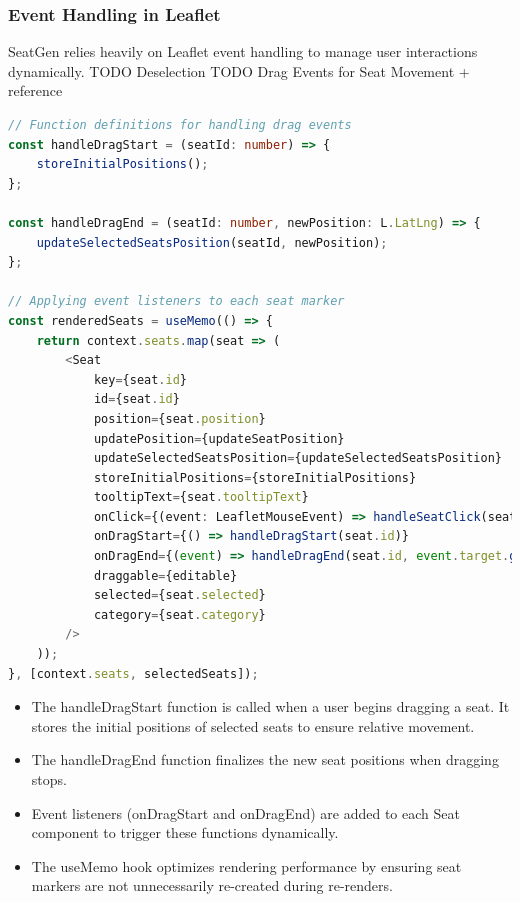 \subsubsection{Event Handling in Leaflet}

SeatGen relies heavily on Leaflet event handling to manage user interactions dynamically. TODO Deselection
TODO Drag Events for Seat Movement + reference

\begin{lstlisting}[language=TypeScript, caption=Handling Seat Drag Events, label=lst:leaflet-seat-drag]
// Function definitions for handling drag events
const handleDragStart = (seatId: number) => {
    storeInitialPositions();
};

const handleDragEnd = (seatId: number, newPosition: L.LatLng) => {
    updateSelectedSeatsPosition(seatId, newPosition);
};

// Applying event listeners to each seat marker
const renderedSeats = useMemo(() => {
    return context.seats.map(seat => (
        <Seat 
            key={seat.id} 
            id={seat.id}
            position={seat.position} 
            updatePosition={updateSeatPosition}
            updateSelectedSeatsPosition={updateSelectedSeatsPosition}
            storeInitialPositions={storeInitialPositions} 
            tooltipText={seat.tooltipText}
            onClick={(event: LeafletMouseEvent) => handleSeatClick(seat.id, event)}
            onDragStart={() => handleDragStart(seat.id)}
            onDragEnd={(event) => handleDragEnd(seat.id, event.target.getLatLng())}
            draggable={editable}
            selected={seat.selected}
            category={seat.category}
        />
    ));
}, [context.seats, selectedSeats]);
\end{lstlisting}

\begin{itemize}
    \item The handleDragStart function is called when a user begins dragging a seat. It stores the initial positions of selected seats to ensure relative movement.
    \item The handleDragEnd function finalizes the new seat positions when dragging stops.
    \item Event listeners (onDragStart and onDragEnd) are added to each Seat component to trigger these functions dynamically.
    \item The useMemo hook optimizes rendering performance by ensuring seat markers are not unnecessarily re-created during re-renders.
\end{itemize}

